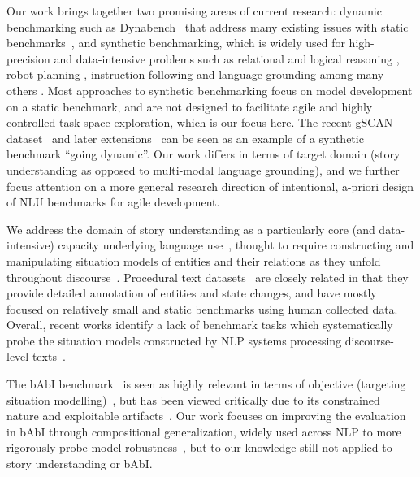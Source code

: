 Our work brings together two promising areas of current research: dynamic benchmarking such as Dynabench~\citep{kiela2021dynabench} that address many  existing issues with static benchmarks~\citep{bowman-dahl-2021-will}, and synthetic benchmarking, which is widely used for high-precision and data-intensive problems such as relational and logical reasoning \cite{sinha-etal-2019-clutrr,clark2020transformers,betz2020critical}, robot planning \cite{banerjee2020transformers}, instruction following and language grounding \cite{long-etal-2016-simpler,lake2018generalization} among many others \cite{richardson2020probing,khot2021learning}. Most approaches to synthetic benchmarking focus on model development on a static benchmark, and are not designed to facilitate agile and highly controlled task space exploration, which is our focus here. The recent gSCAN dataset~\citep{ruis2020benchmark} and later extensions~\citep{qiu2021systematic,wu2021reascan}
 can be seen as an example of a synthetic benchmark ``going dynamic''. Our work differs in terms of target domain (story understanding as opposed to multi-modal language grounding), and we further focus attention on a more general research direction of intentional, a-priori design of NLU benchmarks for agile development.

We address the domain of story understanding as a particularly core (and data-intensive) capacity underlying language use~\citep{McClelland2020}, thought to require constructing and manipulating situation models of entities and their relations as they unfold throughout discourse~\citep{Zwaan2016,tamari-etal-2020-language}.  Procedural text datasets~\citep{dalvi-etal-2018-tracking,tandon-etal-2020-dataset} are closely related in that they provide detailed annotation of entities and state changes, and have mostly focused on relatively small and static benchmarks using human collected data. Overall, recent works identify a lack of benchmark tasks which systematically probe the situation models constructed by NLP systems processing discourse-level texts~\citep{sugawara-etal-2021-benchmarking}. 

The bAbI benchmark~\cite{babi2016} is seen as highly relevant in terms of objective (targeting situation modelling)~\citep{dunietz-etal-2020-test}, but has been viewed critically due to its constrained nature and exploitable artifacts~\citep{kaushik-lipton-2018-much}. Our work focuses on improving the evaluation in bAbI through compositional generalization, widely used across NLP to more rigorously probe model robustness~\citep{finegan-dollak-etal-2018-improving,keysers2020measuring,gontier2020measuring,yanaka-etal-2021-sygns}, but to our knowledge still not applied to story understanding or bAbI.







